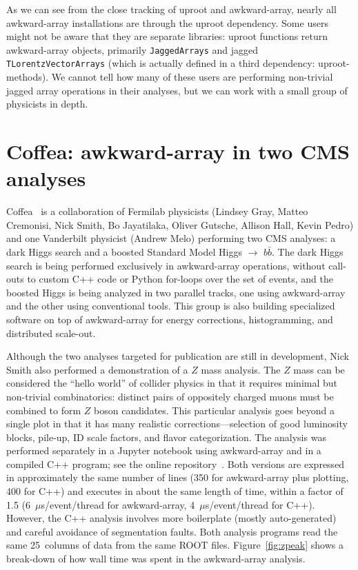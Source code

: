 \documentclass[a4paper]{jpconf}
\begin{document}
As we can see from the close tracking of uproot and awkward-array, nearly all awkward-array installations are through the uproot dependency. Some users might not be aware that they are separate libraries: uproot functions return awkward-array objects, primarily {\tt JaggedArrays} and jagged {\tt TLorentzVectorArrays} (which is actually defined in a third dependency: uproot-methods). We cannot tell how many of these users are performing non-trivial jagged array operations in their analyses, but we can work with a small group of physicists in depth.

\section{Coffea: awkward-array in two CMS analyses}

Coffea~\cite{coffea} is a collaboration of Fermilab physicists (Lindsey Gray, Matteo Cremonisi, Nick Smith, Bo Jayatilaka, Oliver Gutsche, Allison Hall, Kevin Pedro) and one Vanderbilt physicist (Andrew Melo) performing two CMS analyses: a dark Higgs search and a boosted Standard Model Higgs $\to$ $b\bar{b}$. The dark Higgs search is being performed exclusively in awkward-array operations, without call-outs to custom C++ code or Python for-loops over the set of events, and the boosted Higgs is being analyzed in two parallel tracks, one using awkward-array and the other using conventional tools. This group is also building specialized software on top of awkward-array for energy corrections, histogramming, and distributed scale-out.

Although the two analyses targeted for publication are still in development, Nick Smith also performed a demonstration of a $Z$ mass analysis. The $Z$ mass can be considered the ``hello world'' of collider physics in that it requires minimal but non-trivial combinatorics: distinct pairs of oppositely charged muons must be combined to form $Z$ boson candidates. This particular analysis goes beyond a single plot in that it has many realistic corrections---selection of good luminosity blocks, pile-up, ID scale factors, and flavor categorization. The analysis was performed separately in a Jupyter notebook using awkward-array and in a compiled C++ program; see the online repository~\cite{zpeak}. Both versions are expressed in approximately the same number of lines (350 for awkward-array plus plotting, 400 for C++) and executes in about the same length of time, within a factor of 1.5 (6~$\mu$s/event/thread for awkward-array, 4~$\mu$s/event/thread for C++). However, the C++ analysis involves more boilerplate (mostly auto-generated) and careful avoidance of segmentation faults. Both analysis programs read the same 25~columns of data from the same ROOT files. Figure~\ref{fig:zpeak} shows a break-down of how wall time was spent in the awkward-array analysis.
\end{document}
